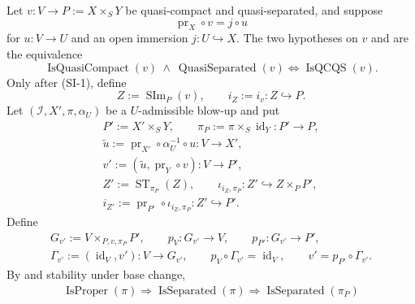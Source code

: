 \begin{lemma}
  \label{lemma:nagata-scheme-image-strict-transform}
  \lean{}

  Let $v\colon V\to P:=X\times_SY$ be quasi-compact and
  quasi-separated, and suppose
  \[
    \operatorname{pr}_X\circ v=j\circ u
  \]
  for $u\colon V\to U$ and an open immersion $j\colon U\hookrightarrow X$.
  The two hypotheses on $v$ and
   are the equivalence
  \[
    \operatorname{IsQuasiCompact}(v)\ \wedge\
      \operatorname{QuasiSeparated}(v)
      \Longleftrightarrow \operatorname{IsQCQS}(v).               \tag{SI-1}
  \]
  Only after (SI-1), define
  \[
    Z:=\operatorname{SIm}_P(v),\qquad
    i_Z:=i_v\colon Z\hookrightarrow P.                            \tag{SI-0}
  \]
  Let $(\mathcal I,X',\pi,\alpha_U)$ be a $U$-admissible blow-up and put
  \[
  \begin{gathered}
    P':=X'\times_SY,\qquad
    \pi_P:=\pi\times_S\operatorname{id}_Y\colon P'\to P,\\
    \widetilde u:=
      \operatorname{pr}_{X'}\circ\alpha_U^{-1}\circ u\colon V\to X',\\
    v':=(\widetilde u,\operatorname{pr}_Y\circ v)\colon V\to P',\\
    Z':=\operatorname{ST}_{\pi_P}(Z),\qquad
    \iota_{i_Z,\pi_P}\colon Z'\hookrightarrow Z\times_PP',\\
    i_{Z'}:=\operatorname{pr}_{P'}\circ\iota_{i_Z,\pi_P}
      \colon Z'\hookrightarrow P'.
  \end{gathered}
  \]
  Define
  \[
  \begin{gathered}
    G_{v'}:=V\times_{P,v,\pi_P}P',\qquad
    p_V\colon G_{v'}\to V,\qquad p_{P'}\colon G_{v'}\to P',\\
    \Gamma_{v'}:=(\operatorname{id}_V,v')\colon V\to G_{v'},\qquad
    p_V\circ\Gamma_{v'}=\operatorname{id}_V,\qquad
    v'=p_{P'}\circ\Gamma_{v'}.
  \end{gathered}                                                   \tag{SI0}
  \]
  By  and stability under base change,
  \[
  \begin{gathered}
    \operatorname{IsProper}(\pi)
      \Longrightarrow \operatorname{IsSeparated}(\pi)
      \Longrightarrow \operatorname{IsSeparated}(\pi_P)

\end{gathered}\]
\end{lemma}
